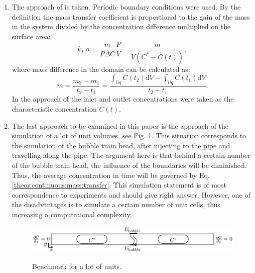\documentclass{article}
\newcommand{\beq}{\begin{equation}}
\newcommand{\feq}{\end{equation}}
\newcommand{\vol}{k_L\,a}
\newcommand{\cstar}{C^{*}}
\begin{document}
\begin{enumerate}
\item
The approach of \citet{vanbaten-circular} is taken. Periodic boundary conditions were used. By the
definition the mass transfer coefficient is
proportional to the gain of the mass in the system divided by the concentration difference
multiplied on the surface area:
\beq
\vol=\frac{\dot{m}}{P \Delta C}\frac{P}{V}=\frac{\dot{m}}{V (\cstar-C(t))},
\feq
where mass difference in the domain can be calculated as:
\beq
\dot{m}=\frac{m_2-m_1}{t_2-t_1}=\frac{\int_{liq}{C(t_2)\mathrm{d}V}-\int_{liq}{C(t_1)\mathrm{d}V}}{
t_2-t_1 } .
\feq
In the approach of \citet{vanbaten-circular} the inlet and outlet concentrations were taken as the
characteristic concentration $C(t)$.


\item 
The last approach to be examined in this paper is the approach of the simulation of a lot of unit
volumes, see Fig. \ref{fig:benchmark:alot}. This situation corresponds to the simulation of the
bubble train head, after injecting to the pipe and travelling along the pipe. The argument here is
that behind a certain number of the bubble train head, the influence of the boundaries will be
diminished. Thus, the average concentration in time will be governed by Eq.
\ref{theor:continuous:mass:transfer}. This simulation statement is of most correspondence to
experiments and should give right answer. However, one of the
disadvantages is to simulate a certain number of unit cells, thus increasing a computational
complexity.
\begin{figure}[htb!]
\includegraphics[width=\textwidth]{Figures/benchmark_alot.eps}\\
\caption{Benchmark for a lot of units. \label{fig:benchmark:alot}}
\end{figure}
\end{enumerate} 
\end{document}
